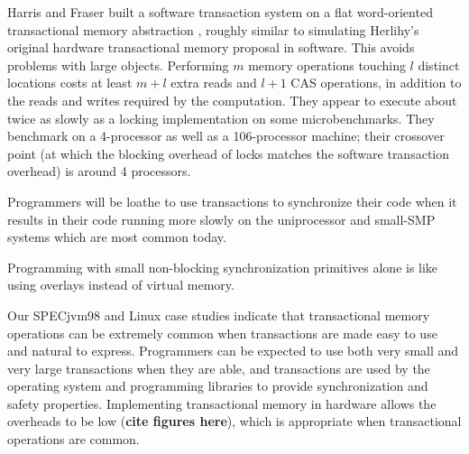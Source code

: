 \documentclass[preprint]{rdbacmconf}
\begin{document}
Harris and Fraser built a software transaction system on a flat
word-oriented transactional memory abstraction \cite{HarrisFr03},
roughly similar to simulating Herlihy's original hardware
transactional memory proposal in software.  This avoids problems with
large objects.  Performing $m$ memory operations touching $l$ distinct
locations costs at least $m+l$ extra reads and $l+1$ CAS operations, in
addition to the reads and writes required by the computation.
They appear to execute about twice as slowly as a locking
implementation on some microbenchmarks.  They benchmark on a
4-processor as well as a 106-processor machine; their crossover point
(at which the blocking overhead of locks matches the software
transaction overhead) is around 4 processors.

Programmers will be loathe to use transactions to synchronize their
code when it results in their code running more slowly on the uniprocessor
and small-SMP systems which are most common today.

Programming with small non-blocking synchronization primitives alone
is like using overlays instead of virtual memory.

Our SPECjvm98 and Linux case studies indicate that
transactional memory operations can be extremely common when
transactions are made easy to use and natural to express.  Programmers
can be expected to use both very small and very large transactions
when they are able, and transactions are used by the operating system
and programming libraries to provide synchronization and safety
properties.  Implementing transactional memory in hardware allows the
overheads to be low (\textbf{cite figures here}), which is appropriate
when transactional operations are common.
\end{document}
